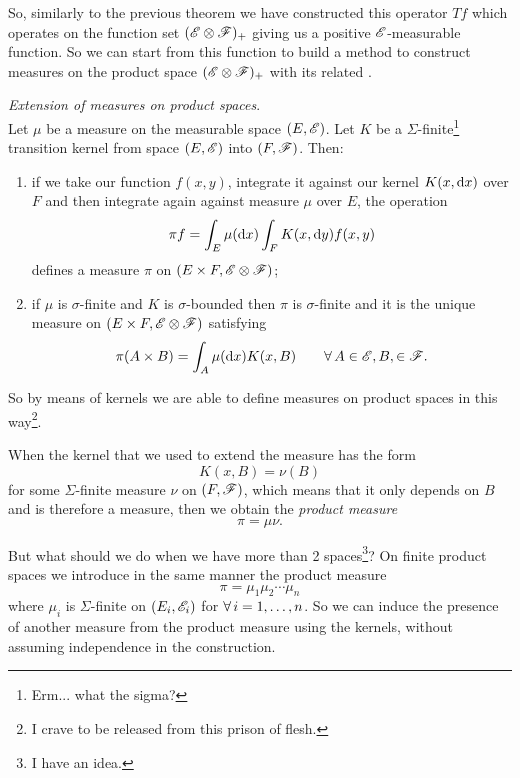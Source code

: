 \documentclass{report}
\begin{document}
So, similarly to the previous theorem we have constructed this operator $Tf$ which operates on the function set $(\mathscr{E}\otimes\mathscr{F})_+$ giving us a positive $\mathscr{E}$-measurable function. So we can start from this function to build a method to construct measures on the product space $(\mathscr{E}\otimes\mathscr{F})_+$ with its related \sa{}.
\begin{theorem}
	\emph{Extension of measures on product spaces}.\\
	Let $\mu$ be a measure on the measurable space $(E,\mathscr{E})$. Let $K$ be a $\Sigma$-finite\footnote{Erm... what the sigma?} transition kernel from space $(E,\mathscr{E})$ into $(F,\mathscr{F})$. Then:
	\begin{enumerate}[\circnum]
		\item if we take our function $f(x,y)$, integrate it against our kernel $K(x,\mathop{}\!\mathrm{d} x)$ over $F$ and then integrate again against measure $\mu$ over $E$, the operation 
		\[\pi f=\int_E\mu(\mathop{}\!\mathrm{d} x)\int_FK(x,\mathop{}\!\mathrm{d} y)f(x,y)\]
		defines a measure $\pi$ on $(E\times F,\mathscr{E}\otimes\mathscr{F})$;
		\item if $\mu$ is $\sigma$-finite and $K$ is $\sigma$-bounded then $\pi$ is $\sigma$-finite and it is the unique measure on $(E\times F,\mathscr{E}\otimes\mathscr{F})$ satisfying
		\[\pi(A\times B)=\int_A\mu(\mathop{}\!\mathrm{d} x)K(x,B)\qquad\forall\, A\in\mathscr{E},B,\in\mathscr{F}.\]
	\end{enumerate}
\end{theorem}
So by means of kernels we are able to define measures on product spaces in this way\footnote{I crave to be released from this prison of flesh.}.
\begin{remark}
	When the kernel that we used to extend the measure has the form 
	\[K(x,B)=\nu(B)\]
	for some $\Sigma$-finite measure $\nu$ on $(F,\mathscr{F})$, which means that it only depends on $B$ and is therefore a measure, then we obtain the \emph{product measure}
	\[\pi=\mu\nu.\]
\end{remark}
But what should we do when we have more than 2 spaces\footnote{I have an idea.}? On finite product spaces we introduce in the same manner the product measure 
\[\pi=\mu_1\mu_2\cdots\mu_n\]
where $\mu_i$ is $\Sigma$-finite on $(E_i,\mathscr{E}_i)$ for $\forall\, i=1,\ldots,n$.
So we can induce the presence of another measure from the product measure using the kernels, without assuming independence in the construction.
\end{document}
